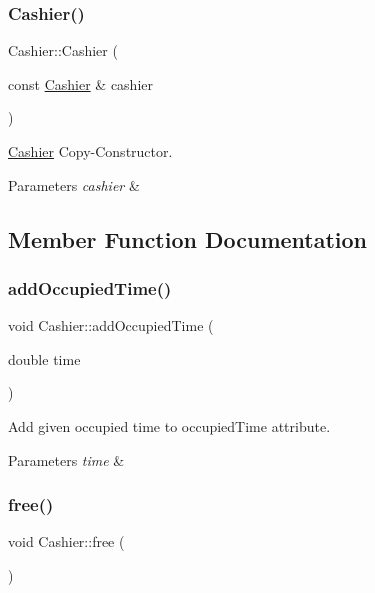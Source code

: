 \subsubsection{\texorpdfstring{Cashier()}{Cashier()}\hspace{0.1cm}{\footnotesize\ttfamily [2/2]}}
{\footnotesize\ttfamily Cashier\+::\+Cashier (\begin{DoxyParamCaption}\item[{const \hyperlink{classCashier}{Cashier} \&}]{cashier }\end{DoxyParamCaption})}

\hyperlink{classCashier}{Cashier} Copy-\/\+Constructor. 
\begin{DoxyParams}{Parameters}
{\em cashier} & \\
\hline
\end{DoxyParams}


\subsection{Member Function Documentation}
\mbox{\label{classCashier_a571d08400e1d738163252caa61cbd165}} 
\subsubsection{\texorpdfstring{add\+Occupied\+Time()}{addOccupiedTime()}}
{\footnotesize\ttfamily void Cashier\+::add\+Occupied\+Time (\begin{DoxyParamCaption}\item[{double}]{time }\end{DoxyParamCaption})}

Add given occupied time to occupied\+Time attribute. 
\begin{DoxyParams}{Parameters}
{\em time} & \\
\hline
\end{DoxyParams}
\mbox{\label{classCashier_ac04b7595d1d7e51dd673590809cb5682}} 
\subsubsection{\texorpdfstring{free()}{free()}}
{\footnotesize\ttfamily void Cashier\+::free (\begin{DoxyParamCaption}{ }\end{DoxyParamCaption})}

